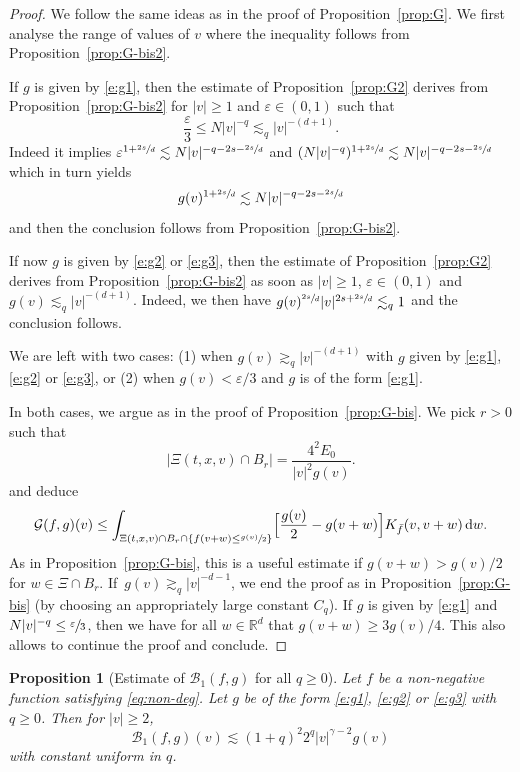 \documentclass[11pt]{article}
\theoremstyle{plain}
\newtheorem{prop}[thm]{Proposition}
\theoremstyle{definition}
\numberwithin{equation}{section}
\newcommand{\R}{\mathbb R}
\newcommand{\eps}{\varepsilon}
\newcommand{\dd} {\, \mathrm{d}}
\let\A N
\begin{document}
\begin{proof}
We follow the same ideas as in the proof of
Proposition~\ref{prop:G}. We first analyse the range of values of
$v$ where the inequality follows from Proposition~\ref{prop:G-bis2}.

If $g$ is given by \eqref{e:g1}, then the estimate of
Proposition~\ref{prop:G2} derives from Proposition~\ref{prop:G-bis2}
for $|v| \ge 1$ and $\eps \in (0,1)$ such that
\[ \frac{\eps}3 \le \A |v|^{-q} \lesssim_q |v|^{-(d+1)}. \] Indeed
it implies
$\eps^{1+\sfrac{2s}d} \lesssim \A |v|^{-q - 2s - \sfrac{2s}d}$ and
$(\A |v|^{-q})^{1+\sfrac{2s}d} \lesssim \A |v|^{-q - 2s -
\sfrac{2s}d}$ which in turn yields
\[ g(v)^{1+\sfrac{2s}d} \lesssim \A |v|^{-q-2s - \sfrac{2s}d}\] and
then the conclusion follows from Proposition~\ref{prop:G-bis2}.

If now $g$ is given by \eqref{e:g2} or \eqref{e:g3}, then the
estimate of Proposition~\ref{prop:G2} derives from
Proposition~\ref{prop:G-bis2} as soon as $|v| \ge 1$,
$\eps \in (0,1)$ and $g(v) \lesssim_q |v|^{-(d+1)}$. Indeed, we then
have $g(v)^{\sfrac{2s}d} |v|^{2s + \sfrac{2s}d} \lesssim_q 1$ and the
conclusion follows.

We are left with two cases: (1) when $g(v) \gtrsim_q |v|^{-(d+1)}$ with
$g$ given by \eqref{e:g1}, \eqref{e:g2} or \eqref{e:g3}, or
(2) when $g(v) < \eps/3$ and $g$ is of the form \eqref{e:g1}.

In both cases, we argue as in the proof of
Proposition~\ref{prop:G-bis}. We pick $r>0$ such that
\[ \left|\Xi(t,x,v) \cap B_r\right| = \frac{4^2E_0}{|v|^2 g(v)}.\]
and deduce
\[
\mathcal G(f,g)(v) \leq \int_{\Xi(t,x,v) \cap B_r \cap \left\{f(v+w)
\le \sfrac{g(v)}{2}\right\}} \Bigl[ \frac{g(v)}{2} - g(v+w)\Bigr]
K_{\bar f}(v,v+w) \dd w.
\]
As in Proposition~\ref{prop:G-bis}, this is a useful estimate if
$g(v+w) > g(v)/2$ for $w \in \Xi \cap B_r$. If~$g(v) \gtrsim_q |v|^{-d-1}$, we end the proof as in
Proposition~\ref{prop:G-bis} (by choosing an appropriately large
constant $C_q$). If $g$ is given by \eqref{e:g1} and
$\A |v|^{-q} \le \sfrac\eps3$, then we have for all $w \in \R^d$ that
$g(v+w) \ge 3g(v)/4$. This also allows to continue the proof and
conclude.
\end{proof}

\begin{prop}[Estimate of {$\mathcal{B}_1(f,g)$} for all $q \ge
0$] \label{prop:B1-2} Let $f$ be a non-negative function satisfying \eqref{eq:non-deg}. Let $g$ be of
the form \eqref{e:g1}, \eqref{e:g2} or \eqref{e:g3} with $q \ge
0$. Then for $|v| \ge 2$,
\[ \mathcal{B}_1 (f,g)(v) \lesssim (1+q)^2 2^q |v|^{\gamma -2} g(v)\]
with constant uniform in $q$.
\end{prop}
\end{document}
